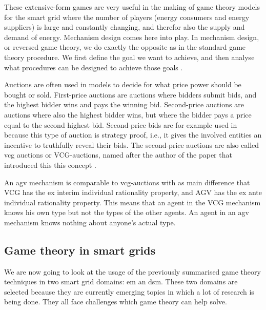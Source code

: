 
These extensive-form games are very useful in the making of game theory models for the smart grid where the number of players (energy consumers and energy suppliers) is large and constantly changing, and therefor also the supply and demand of energy. Mechanism design comes here into play. In mechanism design, or reversed game theory, we do exactly the opposite as in the standard game theory procedure. We first define the goal we want to achieve, and then analyse what procedures can be designed to achieve those goals \cite{SalfatiRabinovici2014}. 

Auctions are often used in models to decide for what price power should be bought or sold. First-price auctions are auctions where bidders submit bids, and the highest bidder wins and pays the winning bid. Second-price auctions are auctions where also the highest bidder wins, but where the bidder pays a price equal to the second highest bid. Second-price bids are for example used in \cite{SaadHanPoorEtAl2011} because this type of auction is strategy proof, i.e., it gives the involved entities an incentive to truthfully reveal their bids. The second-price auctions are also called \ac{vcg} auctions or VCG-auctions, named after the author of the paper that introduced this this concept \cite{Vickrey1961}.

An \ac{agv} mechanism is comparable to \ac{vcg}-auctions with as main difference that VCG has the ex interim individual rationality property, and AGV has the ex ante individual rationality property\cite{ShohamLeyton-Brown2008}. This means that an agent in the VCG mechanism knows his own type but not the types of the other agents. An agent in an \ac{agv} mechanism knows nothing about anyone’s actual type. 

\subsection{Game theory in smart grids}
We are now going to look at the usage of the previously summarised game theory techniques in two smart grid domains: \ac{em} an \ac{dsm}. These two domains are selected because they are currently emerging topics in which a lot of research is being done. They all face challenges which game theory can help solve. 

